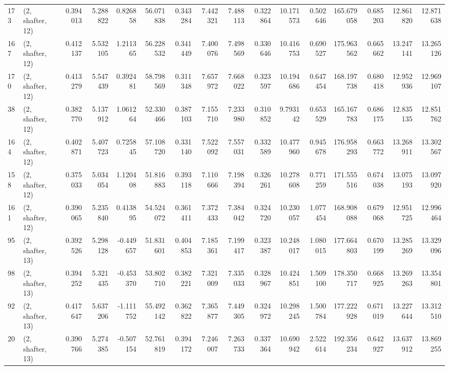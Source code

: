 \begin{tabular}{llrrrrrrrrrrrrrr}
173 &  (2, shafter, 12) &   0.394013 &   5.288822 &  0.826858 &   56.071838 &  0.343284 &   7.442321 &   7.488113 &  0.322864 &  10.171573 &   0.502646 &  165.679058 &  0.685203 &  12.861820 &  12.871638 \\
167 &  (2, shafter, 12) &   0.412137 &   5.532105 &  1.211365 &   56.228532 &  0.341449 &   7.400076 &   7.498569 &  0.330646 &  10.416753 &   0.690527 &  175.963562 &  0.665662 &  13.247141 &  13.265126 \\
170 &  (2, shafter, 12) &   0.413279 &   5.547439 &  0.392481 &   58.798569 &  0.311348 &   7.657972 &   7.668022 &  0.323597 &  10.194686 &   0.647454 &  168.197738 &  0.680418 &  12.952936 &  12.969107 \\
38  &  (2, shafter, 12) &   0.382770 &   5.137912 &  1.061264 &   52.330466 &  0.387103 &   7.155710 &   7.233980 &  0.310852 &   9.793142 &   0.653529 &  165.167783 &  0.686175 &  12.835135 &  12.851762 \\
164 &  (2, shafter, 12) &   0.402871 &   5.407723 &  0.725845 &   57.108720 &  0.331140 &   7.522092 &   7.557031 &  0.332589 &  10.477960 &   0.945678 &  176.958293 &  0.663772 &  13.268911 &  13.302567 \\
158 &  (2, shafter, 12) &   0.375033 &   5.034054 &  1.120408 &   51.816883 &  0.393118 &   7.110666 &   7.198394 &  0.326261 &  10.278608 &   0.771259 &  171.555516 &  0.674038 &  13.075193 &  13.097920 \\
161 &  (2, shafter, 12) &   0.390065 &   5.235840 &  0.413895 &   54.524072 &  0.361411 &   7.372433 &   7.384042 &  0.324720 &  10.230057 &   1.077454 &  168.908088 &  0.679068 &  12.951725 &  12.996464 \\
95  &  (2, shafter, 13) &   0.392526 &   5.298128 & -0.449657 &   51.831601 &  0.404853 &   7.185361 &   7.199417 &  0.323387 &  10.248017 &   1.080015 &  177.664803 &  0.670199 &  13.285269 &  13.329096 \\
98  &  (2, shafter, 13) &   0.394252 &   5.321435 & -0.453370 &   53.802710 &  0.382221 &   7.321009 &   7.335033 &  0.328967 &  10.424851 &   1.509100 &  178.350717 &  0.668925 &  13.269263 &  13.354801 \\
92  &  (2, shafter, 13) &   0.417647 &   5.637206 & -1.111752 &   55.492142 &  0.362822 &   7.365877 &   7.449305 &  0.324972 &  10.298245 &   1.500784 &  177.222928 &  0.671019 &  13.227644 &  13.312510 \\
20  &  (2, shafter, 13) &   0.390766 &   5.274385 & -0.507154 &   52.761819 &  0.394172 &   7.246007 &   7.263733 &  0.337364 &  10.690942 &   2.522614 &  192.356234 &  0.642927 &  13.637912 &  13.869255 \\

\end{tabular}
